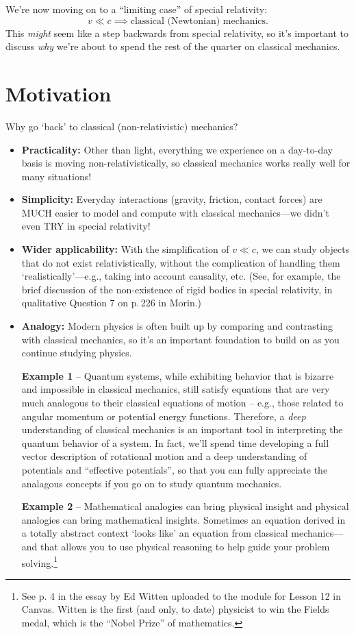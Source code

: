 \documentclass[11pt, letterpaper, openany]{book}
\begin{document}
We're now moving on to a ``limiting case'' of special relativity:
\[ v \ll c \implies \text{classical (Newtonian) mechanics.} \]
This \textit{might} seem like a step backwards from special relativity, so it's important to discuss \textit{why} we're about to spend the rest of the quarter on classical mechanics.

\section{Motivation}

Why go `back' to classical (non-relativistic) mechanics?
\begin{itemize}
    \item \textbf{Practicality:} Other than light, everything we experience on a day-to-day basis is moving non-relativistically, so classical mechanics works really well for many situations!
    \item \textbf{Simplicity:} Everyday interactions (gravity, friction, contact forces) are MUCH easier to model and compute with classical mechanics---we didn't even TRY in special relativity!
    \item \textbf{Wider applicability:} With the simplification of $v \ll c$, we can study objects that do not exist relativistically, without the complication of handling them `realistically'---e.g., taking into account causality, etc. (See, for example, the brief discussion of the non-existence of rigid bodies in special relativity, in qualitative Question 7 on p.\,226 in Morin.)
    \item \textbf{Analogy:} Modern physics is often built up by comparing and contrasting with classical mechanics, so it's an important foundation to build on as you continue studying physics.
    
    \textbf{Example 1} -- Quantum systems, while exhibiting behavior that is bizarre and impossible in classical mechanics, still satisfy equations that are very much analogous to their classical equations of motion -- e.g., those related to angular momentum or potential energy functions. Therefore, a \textit{deep} understanding of classical mechanics is an important tool in interpreting the quantum behavior of a system. In fact, we'll spend time developing a full vector description of rotational motion and a deep understanding of potentials and ``effective potentials'', so that you can fully appreciate the analagous concepts if you go on to study quantum mechanics.
    
    \textbf{Example 2} -- Mathematical analogies can bring physical insight and physical analogies can bring mathematical insights. Sometimes an equation derived in a totally abstract context `looks like' an equation from classical mechanics---and that allows you to use physical reasoning to help guide your problem solving.\footnote{See p. 4 in the essay by Ed Witten uploaded to the module for Lesson 12 in Canvas. Witten is the first (and only, to date) physicist to win the Fields medal, which is the ``Nobel Prize'' of mathematics.}
    

\end{itemize}
\end{document}
